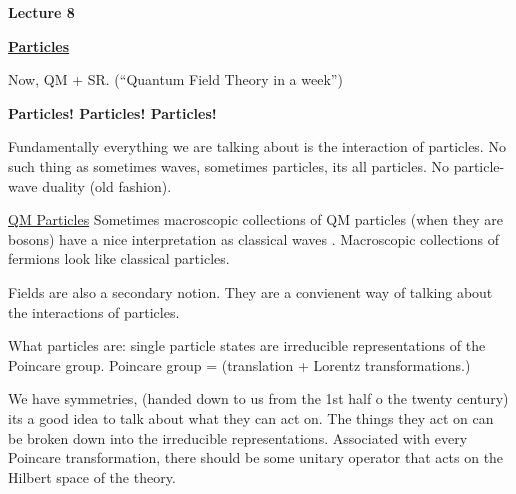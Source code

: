 



\thispagestyle{fancy}

\begin{center}
{\huge \textbf{Lecture 8}}
\end{center}

{\fontsize{14}{16}\selectfont

\textbf{\underline{Particles}} 

Now, QM + SR.  (``Quantum Field Theory in a week'')

\begin{center}
\textbf{Particles! Particles! Particles! }
\end{center}


Fundamentally everything we are talking about is the interaction of particles.
No such thing as sometimes waves, sometimes particles, its all particles.
No particle-wave duality (old fashion).

\underline{QM Particles}
Sometimes macroscopic collections of QM particles (when they are bosons) have a nice interpretation as classical waves .
Macroscopic collections of fermions look like classical particles.


Fields are also a secondary notion.
They are a convienent way of talking about the interactions of particles.

What particles are:
single particle states are irreducible representations of the Poincare group. 
Poincare group = (translation + Lorentz transformations.)

We have symmetries, (handed down to us from the 1st half o the twenty century) its a good idea to talk about what they can act on.
The things they act on can be broken down into the irreducible representations.
Associated with every Poincare transformation, there should be some unitary operator that acts on the Hilbert space of the theory.


}
